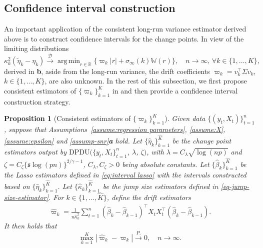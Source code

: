 \documentclass[11pt]{article}
\DeclareMathOperator*{\argmin}{arg\,min}
\newcommand{\s}{ { \mathfrak{s}  } }
\theoremstyle{plain}
\newtheorem{proposition}[theorem]{Proposition}
\theoremstyle{definition}
\begin{document}
\subsection{Confidence interval construction}\label{sec-CI}

An important application of the consistent long-run variance estimator derived above is to construct confidence intervals for the change points.  In view of the limiting distributions
    \[
        \kappa_k^{2}( \widetilde{\eta}_k - \eta_k) \overset{\mathcal{D}}{\longrightarrow} \argmin_{r \in \mathbb{R}} \big\{\varpi_k|r| + \sigma_{\infty}(k)\mathbb{W}(r)\big\}, \quad n \to \infty, \, \forall k \in \{1, \ldots, K\},
    \]
    derived in \textbf{b}, aside from the long-run variance, the drift coefficients $\varpi_k = v_k^{\top}\Sigma v_k$, $k \in \{1, \ldots, K\}$, are also unknown.  In the rest of this subsection, we first propose consistent estimators of $\{\varpi_k\}_{k = 1}^K$ in  and then provide a confidence interval construction strategy. 
    
\begin{proposition}[Consistent estimators of $\{\varpi_k\}_{k = 1}^K$] \label{thm:quadratic_consist}
Given data $\{(y_t, X_t)\}_{t = 1}^n$, suppose that Assumptions~\ref{assume:regression parameters}, \ref{assume:X}, \ref{assume:epsilon} and \ref{assump-snr}\textbf{a} hold.  Let $\{\widehat{\eta}_k\}_{k = 1}^{\widehat{K}}$ be the change point estimators output by $\mathrm{DPDU}(\{y_t, X_t\}_{t = 1}^n$, $\lambda$, $\zeta)$, with $\lambda = C_\lambda \sqrt{\log(np)}$ and $\zeta = C_\zeta\{\s \log(pn)\}^{2/\gamma - 1}$, $C_{\lambda}, C_{\zeta} > 0$ being absolute constants. Let $\{\widehat{\beta}_k\}_{k = 1}^{\widehat{K}}$ be the Lasso estimators defined in \eqref{eq:interval lasso} with the intervals constructed based on $\{\widehat{\eta}_k\}_{k = 1}^{\widehat{K}}$.  Let $\{\widehat{\kappa}_k\}_{k = 1}^{\widehat{K}}$ be the jump size estimators defined in \eqref{eq-jump-size-estimator}.  For $k \in \{1, \ldots, \widehat{K}\}$, define the drift estimators
\begin{align}\label{eq-drift-est}
    \widehat{\varpi}_k =  \frac{1}{n\widehat{\kappa}_k^2}\sum_{t = 1}^n(\widehat{\beta}_{k} - \widehat{\beta}_{k-1})^{\top}X_tX_t^{\top}(\widehat{\beta}_{k} - \widehat{\beta}_{k-1}).
\end{align}
It then holds that 
\[
    \max_{k = 1}^K |\widehat{\varpi}_k -\varpi_k| \overset{P.}{\longrightarrow} 0, \quad n \to \infty.
\]
\end{proposition}
\end{document}
